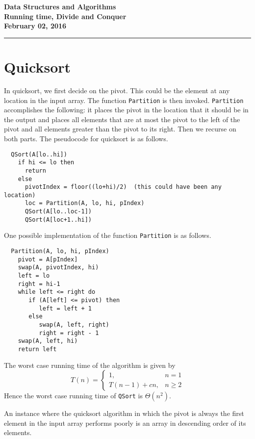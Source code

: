 \documentclass[11pt,twoside]{article}
\newcommand{\coursetitle}{Data Structures and Algorithms}
\newcommand{\docdate}{February 02, 2016}
\newcommand{\duedate}{February 02, 2016}
\newcommand{\doctitle}{Running time, Divide and Conquer}
\newcommand{\student}{PUT YOUR NAME HERE}
\begin{document}
\thispagestyle{empty}

\begin{center}
\Large\bf\coursetitle\\[2pt]\doctitle\\ \large\docdate
\end{center}
\vspace*{0.10in}

\hrule
\section*{Quicksort}
In quicksort, we first decide on the pivot. This could be the element
at any
location in the input array. The function \texttt{Partition} is then
invoked. \texttt{Partition} accomplishes the following: it places the
pivot in the location that it should be in the output and places all
elements that are at most the pivot to the left of the pivot and all
elements greater than the pivot to its right. Then we recurse on both
parts. The pseudocode for quicksort is as follows.
\begin{verbatim}
  QSort(A[lo..hi])
    if hi <= lo then
      return
    else
      pivotIndex = floor((lo+hi)/2)  (this could have been any location)
      loc = Partition(A, lo, hi, pIndex)
      QSort(A[lo..loc-1])
      QSort(A[loc+1..hi])
\end{verbatim}

One possible implementation of the function \texttt{Partition} is as follows.
\begin{verbatim}
  Partition(A, lo, hi, pIndex)
    pivot = A[pIndex]
    swap(A, pivotIndex, hi)
    left = lo
    right = hi-1
    while left <= right do
       if (A[left] <= pivot) then
          left = left + 1
       else
          swap(A, left, right)
          right = right - 1
    swap(A, left, hi)
    return left
\end{verbatim}

The worst case running time of the algorithm is given by
\[
T(n) = \left\{ \begin{array}{ll}
       1, &  n=1\\
       T(n-1) + cn, &  n \geq 2
      \end{array} \right.
\]
Hence the worst case running time of \texttt{QSort} is $\Theta(n^2)$.

An instance where the quicksort algorithm in which the pivot is
always the first element in the input array performs poorly is an
array in descending order of its elements.
\end{document}
